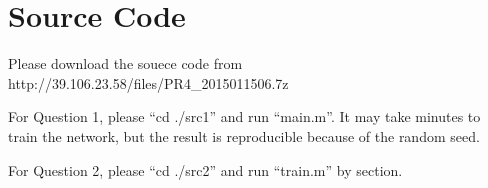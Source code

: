 \documentclass{article}
\begin{document}
\section*{Source Code}
{
    Please download the souece code from http://39.106.23.58/files/PR4\_2015011506.7z

    For Question 1, please ``cd ./src1'' and run ``main.m''. It may take minutes to train the network, but the result is reproducible because of the random seed.

    For Question 2, please ``cd ./src2'' and run ``train.m'' by section.
}

\clearpage
\end{document}
